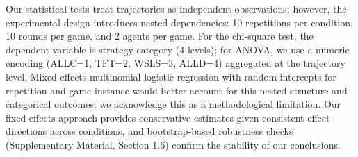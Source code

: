 \documentclass{article}
\begin{document}
\begin{table}[ht]
\centering
\footnotesize
\caption{Statistical validation summary: (a) hypothesis tests for stake effects, (b) classifier comparison for strategy recognition ($n$=80,640 test samples, 4-strategy, 5\% noise).}
\label{tab:combined_validation}
\vspace{0.5em}
\end{table}

Our statistical tests treat trajectories as independent observations; however, the experimental design introduces nested dependencies: 10 repetitions per condition, 10 rounds per game, and 2 agents per game. For the chi-square test, the dependent variable is strategy category (4 levels); for ANOVA, we use a numeric encoding (ALLC=1, TFT=2, WSLS=3, ALLD=4) aggregated at the trajectory level. Mixed-effects multinomial logistic regression with random intercepts for repetition and game instance would better account for this nested structure and categorical outcomes; we acknowledge this as a methodological limitation. Our fixed-effects approach provides conservative estimates given consistent effect directions across conditions, and bootstrap-based robustness checks (Supplementary Material, Section 1.6) confirm the stability of our conclusions.
\end{document}
